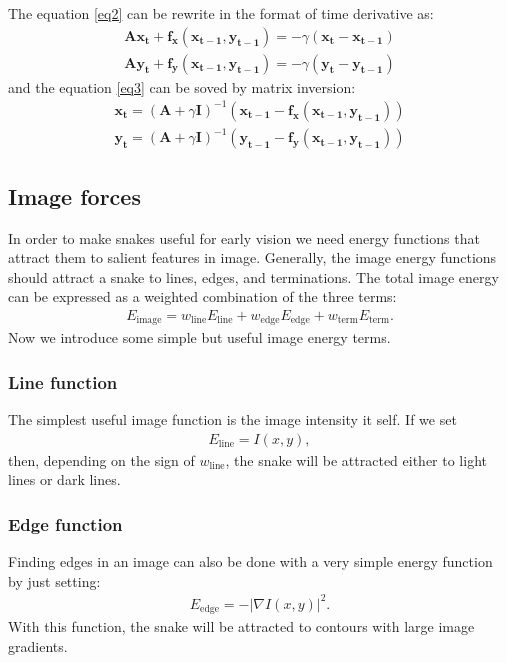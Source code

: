 \documentclass[journal]{IEEEtran}
\begin{document}
The equation \ref{eq2} can be rewrite in the format of time derivative as:
\begin{equation}\begin{aligned}
  \mathbf{Ax_t+f_x(x_{t-1},y_{t-1})}=-\gamma(\mathbf{x_t-x_{t-1}})\\
  \mathbf{Ay_t+f_y(x_{t-1},y_{t-1})}=-\gamma(\mathbf{y_t-y_{t-1}}) \label{eq3}
\end{aligned}\end{equation}
and the equation \ref{eq3} can be soved by matrix inversion:
\begin{equation}\begin{aligned}
\mathbf{x_t}=(\mathbf{A}+\gamma\mathbf{I})^{-1}(\mathbf{x_{t-1}-f_x(x_{t-1},y_{t-1})})\\
\mathbf{y_t}=(\mathbf{A}+\gamma\mathbf{I})^{-1}(\mathbf{y_{t-1}-f_y(x_{t-1},y_{t-1})})\label{eq5}
\end{aligned}\end{equation}

\subsection{Image forces}
In order to make snakes useful for early vision we need energy functions that attract them to salient features in image. Generally, the image energy functions should attract a snake to lines, edges, and terminations. The total image energy can be expressed as a weighted combination of the three terms:
\begin{equation}\begin{aligned}
E_{\text{image}}=w_{\text{line}}E_{\text{line}}+w_{\text{edge}}E_{\text{edge}}+w_{\text{term}}E_{\text{term}}.
\end{aligned}\end{equation}
Now we introduce some simple but useful image energy terms.
\subsubsection{Line function}
The simplest useful image function is the image intensity it self. If we set
\begin{equation}\begin{aligned}
E_{\text{line}}=I(x,y),
\end{aligned}\end{equation}
then, depending on the sign of $w_{\text{line}}$, the snake will be attracted either to light lines or dark lines.
\subsubsection{Edge function}
Finding edges in an image can also be done with a very simple energy function by just setting:
\begin{equation}\begin{aligned}
E_{\text{edge}}=-|\nabla I(x,y)|^2.\label{eq4}
\end{aligned}\end{equation}
With this function, the snake will be attracted to contours with large image gradients.
\end{document}
